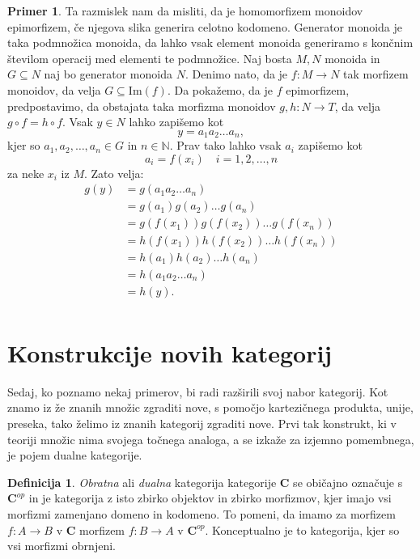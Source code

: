 \documentclass[12pt,a4paper]{book}
\theoremstyle{definition}
\newtheorem{definicija}{Definicija}[chapter]
\theoremstyle{plain}
\theoremstyle{definition}
\newtheorem{primer}{Primer}[section]
\theoremstyle{remark}
\newcommand{\cat}[1]{\textbf{#1}}
\begin{document}
\begin{primer}
Ta razmislek nam da misliti, da je homomorfizem monoidov epimorfizem, če njegova slika generira celotno kodomeno. Generator monoida je taka podmnožica monoida, da lahko vsak element monoida generiramo s končnim številom operacij med elementi te podmnožice. Naj bosta $M,N$ monoida in $G \subseteq N$ naj bo generator monoida $N$. Denimo nato, da je $f: M \to N$ tak morfizem monoidov, da velja $G \subseteq \mathrm{Im}(f)$. Da pokažemo, da je $f$ epimorfizem, predpostavimo, da obstajata taka morfizma monoidov $g,h: N \to T$, da velja $g \circ f = h \circ f$. Vsak $y \in N$ lahko zapišemo kot 
$$y = a_1 a_2 \ldots a_n,$$
kjer so $a_1,a_2,\ldots,a_n \in G$ in $n \in \mathbb{N}$. Prav tako lahko  vsak $a_i$ zapišemo kot
$$a_i = f(x_i) \quad i=1,2,\ldots,n$$
za neke $x_i$ iz $M$. Zato velja:
\begin{align*}
g(y) &= g(a_1 a_2 \ldots a_n) \\
&= g(a_1) g(a_2) \ldots g(a_n) \\
&= g(f(x_1)) g(f(x_2)) \ldots g(f(x_n)) \\
&= h(f(x_1)) h(f(x_2)) \ldots h(f(x_n)) \\
&= h(a_1) h(a_2) \ldots h(a_n) \\
&= h(a_1 a_2 \ldots a_n) \\
&= h(y). \\
\end{align*}


\end{primer}


\section{Konstrukcije novih kategorij}

Sedaj, ko poznamo nekaj primerov, bi radi razširili svoj nabor kategorij. Kot znamo iz že znanih množic zgraditi nove, s pomočjo kartezičnega produkta, unije, preseka, tako želimo iz znanih kategorij zgraditi nove. Prvi tak konstrukt, ki v teoriji množic nima svojega točnega analoga, a se izkaže za izjemno pomembnega, je pojem dualne kategorije.


\begin{definicija}

\emph{Obratna} ali \emph{dualna} kategorija kategorije $\cat{C}$ se običajno označuje s $\cat{C}^{op}$ in je kategorija z isto zbirko objektov in zbirko morfizmov, kjer imajo vsi morfizmi zamenjano domeno in kodomeno. 
To pomeni, da imamo za morfizem $f : A \to B$ v $\cat{C}$ morfizem $f : B \to A$ v $\cat{C}^{op}$. Konceptualno je to kategorija, kjer so vsi morfizmi obrnjeni.
\end{definicija}
\end{document}

